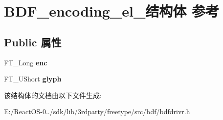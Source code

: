 \hypertarget{struct_b_d_f__encoding__el__}{}\section{B\+D\+F\+\_\+encoding\+\_\+el\+\_\+结构体 参考}
\label{struct_b_d_f__encoding__el__}
\subsection*{Public 属性}
\begin{DoxyCompactItemize}
\item 
\mbox{\label{struct_b_d_f__encoding__el___ae3c66cb3ed3eca479edc8bbc9e7dcc85}} 
F\+T\+\_\+\+Long {\bfseries enc}
\item 
\mbox{\label{struct_b_d_f__encoding__el___ac8c8053f00957865bd002a48420db181}} 
F\+T\+\_\+\+U\+Short {\bfseries glyph}
\end{DoxyCompactItemize}


该结构体的文档由以下文件生成\+:\begin{DoxyCompactItemize}
\item 
E\+:/\+React\+O\+S-\/0../sdk/lib/3rdparty/freetype/src/bdf/bdfdrivr.\+h\end{DoxyCompactItemize}
